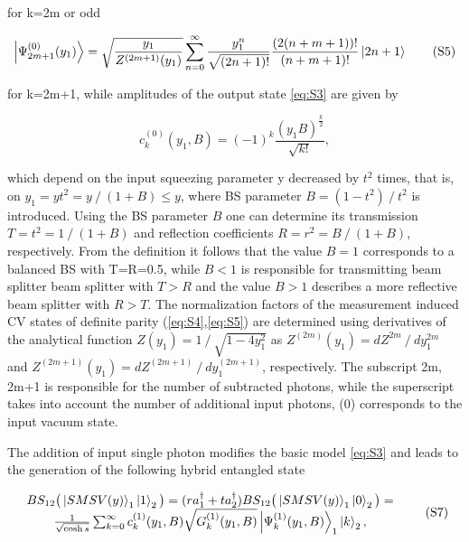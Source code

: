 \documentclass{optica-article}
\begin{document}
\!\!\!\!\!\!for k=2m or odd


\begin{equation}\label{eq:S5}
    \ket{\Psi_{2m+1}^{(0)}(y_1)} =
    \sqrt{\frac{y_1}{{Z^{(2m+1)}}(y_1)}}\sum_{n=0}^{\infty} \frac{y_1^{n}}{\sqrt{(2n+1)!}}\frac{(2(n+m+1))!}{(n+m+1)!}\ket{2n+1}  
\tag{S5}
\end{equation}


\!\!\!\!\!\!for k=2m+1, while amplitudes of the output state \eqref{eq:S3}  are given by 

\begin{equation}\label{eq:S6}
    c_k^{(0)}(y_1,B) = (-1)^{k}\frac{(y_1B)^{\frac{k}{2}}}{\sqrt{k!}},
\tag{S6}
\end{equation}


\!\!\!\!\!\!which depend on the input squeezing parameter y decreased by $t^2$ times, that is, on $y_1=yt^2=y⁄(1+B)\leq y$, where BS parameter $B=(1-t^2)⁄t^2$  is introduced. Using the BS parameter $B$ one can determine its transmission $T=t^2=1⁄(1+B)$ and reflection coefficients $R=r^2=B⁄(1+B)$, respectively. From the definition it follows that the value $B=1$ corresponds to a balanced BS with T=R=0.5, while $B<1$ is responsible for transmitting beam splitter beam splitter with $T>R$ and the value $B>1$ describes a more reflective beam splitter with $R>T$. The normalization factors of the measurement induced CV states of definite parity (\ref{eq:S4},\ref{eq:S5}) are determined using derivatives of the analytical function $Z(y_1)=1⁄\sqrt{1-4y_1^2 }$ as $Z^{(2m)}(y_1)=dZ^{2m}⁄dy_1^{2m}$ and $Z^{(2m+1)}(y_1)=dZ^{(2m+1)}⁄dy_1^{(2m+1)}$, respectively. The subscript 2m,\,2m+1 is responsible for the number of subtracted photons, while the superscript takes into account the number of additional input photons, (0) corresponds to the input vacuum state.
\par The addition of input single photon modifies the basic model \eqref{eq:S3}  and leads to the generation of the following hybrid entangled state \cite{3}    



\begin{equation}\label{eq:S7}
        \begin{array}{c}
         BS_{12}\big(\ket{SMSV(y)}_1\ket{1}_2\big) = (ra_1^{\dagger}+ta_2^{\dagger})BS_{12}\big(\ket{SMSV(y)}_1\ket{0}_2\big)= \\
            \frac{1}{\sqrt{\cosh s}}\sum_{k=0}^{\infty} c_k^{(1)}(y_1,B)
            \sqrt{G_k^{(1)}(y_1,B)}\ket{\Psi_k^{(1)}(y_1,B)}_1 \ket{k}_2,
        \end{array}
    \tag{S7}
\end{equation}
\end{document}
